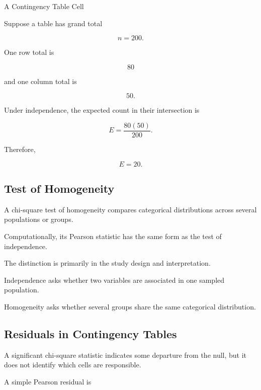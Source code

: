 \begin{workedexamplebox}{A Contingency Table Cell}

Suppose a table has grand total

\[
n=200.
\]

One row total is

\[
80
\]

and one column total is

\[
50.
\]

Under independence, the expected count in their intersection is

\[
E
=
\frac{
80(50)
}{
200
}.
\]

Therefore,

\begin{answerbox}
\[
\boxed{
E=20.
}
\]
\end{answerbox}

\end{workedexamplebox}

\subsection{Test of Homogeneity}
\label{subsec:test-of-homogeneity}

A chi-square test of homogeneity compares categorical distributions
across several populations or groups.

Computationally, its Pearson statistic has the same form as the test of
independence.

The distinction is primarily in the study design and interpretation.

Independence asks whether two variables are associated in one sampled
population.

Homogeneity asks whether several groups share the same categorical
distribution.

\subsection{Residuals in Contingency Tables}
\label{subsec:contingency-residuals}

A significant chi-square statistic indicates some departure from the
null, but it does not identify which cells are responsible.

A simple Pearson residual is

